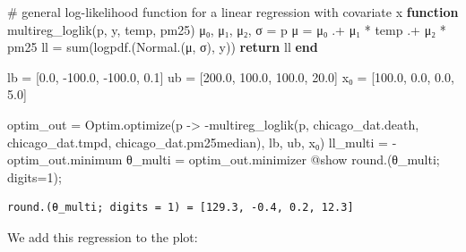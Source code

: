 \documentclass[
  letterpaper,
  DIV=11,
  numbers=noendperiod]{scrartcl}
\newenvironment{Shaded}{\begin{snugshade}}{\end{snugshade}}
\newcommand{\CommentTok}[1]{\textcolor[rgb]{0.37,0.37,0.37}{#1}}
\newcommand{\ControlFlowTok}[1]{\textcolor[rgb]{0.00,0.23,0.31}{\textbf{#1}}}
\newcommand{\FloatTok}[1]{\textcolor[rgb]{0.68,0.00,0.00}{#1}}
\newcommand{\FunctionTok}[1]{\textcolor[rgb]{0.28,0.35,0.67}{#1}}
\newcommand{\KeywordTok}[1]{\textcolor[rgb]{0.00,0.23,0.31}{\textbf{#1}}}
\newcommand{\NormalTok}[1]{\textcolor[rgb]{0.00,0.23,0.31}{#1}}
\newcommand{\OperatorTok}[1]{\textcolor[rgb]{0.37,0.37,0.37}{#1}}
\newcommand{\PreprocessorTok}[1]{\textcolor[rgb]{0.68,0.00,0.00}{#1}}
\begin{document}
\begin{Shaded}
\begin{Highlighting}[]
\CommentTok{\# general log{-}likelihood function for a linear regression with covariate x}
\KeywordTok{function} \FunctionTok{multireg\_loglik}\NormalTok{(p, y, temp, pm25)}
\NormalTok{    μ₀, μ₁, μ₂, σ }\OperatorTok{=}\NormalTok{ p}
\NormalTok{    μ }\OperatorTok{=}\NormalTok{ μ₀ }\OperatorTok{.+}\NormalTok{ μ₁ }\OperatorTok{*}\NormalTok{ temp }\OperatorTok{.+}\NormalTok{ μ₂ }\OperatorTok{*}\NormalTok{ pm25}
\NormalTok{    ll }\OperatorTok{=} \FunctionTok{sum}\NormalTok{(}\FunctionTok{logpdf}\NormalTok{.(}\FunctionTok{Normal}\NormalTok{.(μ, σ), y))}
    \ControlFlowTok{return}\NormalTok{ ll}
\KeywordTok{end}

\NormalTok{lb }\OperatorTok{=}\NormalTok{ [}\FloatTok{0.0}\NormalTok{, }\OperatorTok{{-}}\FloatTok{100.0}\NormalTok{, }\OperatorTok{{-}}\FloatTok{100.0}\NormalTok{, }\FloatTok{0.1}\NormalTok{]}
\NormalTok{ub }\OperatorTok{=}\NormalTok{ [}\FloatTok{200.0}\NormalTok{, }\FloatTok{100.0}\NormalTok{, }\FloatTok{100.0}\NormalTok{, }\FloatTok{20.0}\NormalTok{]}
\NormalTok{x₀ }\OperatorTok{=}\NormalTok{ [}\FloatTok{100.0}\NormalTok{, }\FloatTok{0.0}\NormalTok{, }\FloatTok{0.0}\NormalTok{, }\FloatTok{5.0}\NormalTok{]}

\NormalTok{optim\_out }\OperatorTok{=}\NormalTok{ Optim.}\FunctionTok{optimize}\NormalTok{(p }\OperatorTok{{-}\textgreater{}} \FunctionTok{{-}multireg\_loglik}\NormalTok{(p, chicago\_dat.death, chicago\_dat.tmpd, chicago\_dat.pm25median), lb, ub, x₀)}
\NormalTok{ll\_multi }\OperatorTok{=} \OperatorTok{{-}}\NormalTok{optim\_out.minimum}
\NormalTok{θ\_multi }\OperatorTok{=}\NormalTok{ optim\_out.minimizer}
\PreprocessorTok{@show} \FunctionTok{round}\NormalTok{.(θ\_multi; digits}\OperatorTok{=}\FloatTok{1}\NormalTok{);}
\end{Highlighting}
\end{Shaded}

\begin{verbatim}
round.(θ_multi; digits = 1) = [129.3, -0.4, 0.2, 12.3]
\end{verbatim}

We add this regression to the plot:
\end{document}
